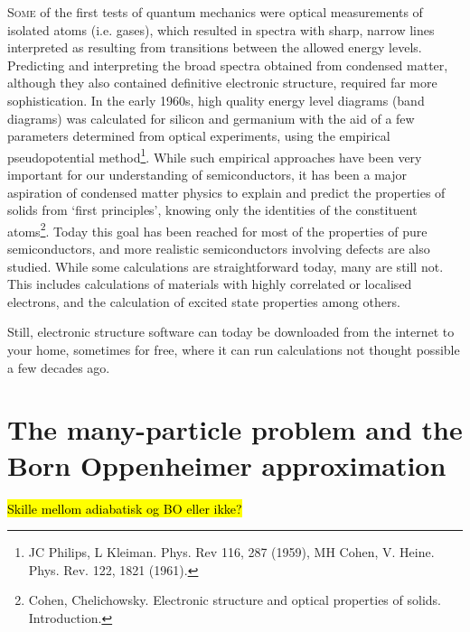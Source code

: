 \documentclass[11pt,bibliography=totoc,index=totoc]{scrbook}   %
\newcommand{\comment}[1]{\hl{#1}}
\begin{document}
\lettrine[lines=3,slope=0pt,nindent=0pt]{S}{ome}
of the first tests of quantum mechanics were optical measurements of
isolated atoms (i.e. gases), which resulted in spectra with sharp, narrow 
lines interpreted as resulting from transitions between the allowed energy 
levels. Predicting and interpreting the broad spectra obtained from condensed 
matter, although they also contained definitive electronic structure, required 
far more sophistication. In the early 1960s, high quality energy level diagrams 
(band diagrams) was calculated for silicon and germanium with the aid of a few
parameters determined from optical experiments, using the empirical
pseudopotential method\footnote{JC Philips, L Kleiman. Phys. Rev 116, 287
(1959), MH Cohen, V. Heine. Phys. Rev. 122, 1821 (1961).}. While such
empirical approaches have been very important for our understanding of
semiconductors, it has been a major aspiration of condensed matter
physics to explain and predict the properties of solids from `first
principles', knowing only the identities of the constituent
atoms\footnote{Cohen, Chelichowsky. Electronic structure and optical
properties of solids. Introduction.}. Today this goal has been reached for
most of the properties of pure semiconductors, and more realistic
semiconductors involving defects are also studied. While some calculations
are straightforward today, many are still not. This includes calculations of
materials with highly correlated or localised electrons, and the calculation
of excited state properties among others.

Still, electronic structure software can today be downloaded from the
internet to your home, sometimes for free, where it can run calculations 
not thought possible a few
decades ago. 

\section{The many-particle problem and the Born Oppenheimer approximation}\label{sec:born-oppenheimer}
\comment{Skille mellom adiabatisk og BO eller ikke?}
\end{document}
